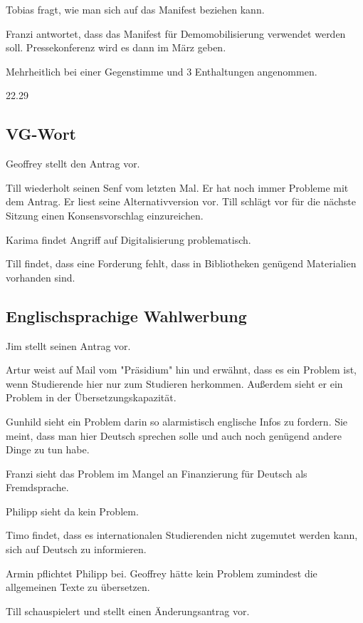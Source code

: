 \documentclass[ngerman,headheight=70pt]{scrartcl}
\begin{document}
    Tobias fragt, wie man sich auf das Manifest beziehen kann.

    Franzi antwortet, dass das Manifest für Demomobilisierung verwendet werden soll.
    Pressekonferenz wird es dann im März geben.

    Mehrheitlich bei einer Gegenstimme und 3 Enthaltungen angenommen.

    22.29
    \subsection{VG-Wort}

    Geoffrey stellt den Antrag vor.

    Till wiederholt seinen Senf vom letzten Mal. Er hat noch immer Probleme
    mit dem Antrag. Er liest seine Alternativversion vor. Till schlägt vor
    für die nächste Sitzung einen Konsensvorschlag einzureichen.

    Karima findet Angriff auf Digitalisierung problematisch.

    Till findet, dass eine Forderung fehlt, dass in Bibliotheken genügend
    Materialien vorhanden sind.

    \subsection{Englischsprachige Wahlwerbung}

    Jim stellt seinen Antrag vor.

    Artur weist auf Mail vom "Präsidium" hin und erwähnt, dass es ein Problem
    ist, wenn Studierende hier nur zum Studieren herkommen. Außerdem sieht
    er ein Problem in der Übersetzungskapazität.

    Gunhild sieht ein Problem darin so alarmistisch englische Infos zu fordern.
    Sie meint, dass man hier Deutsch sprechen solle und auch noch genügend andere
    Dinge zu tun habe.

    Franzi sieht das Problem im Mangel an Finanzierung für Deutsch als Fremdsprache.

    Philipp sieht da kein Problem.

    Timo findet, dass es internationalen Studierenden nicht zugemutet werden kann,
    sich auf Deutsch zu informieren.

    Armin pflichtet Philipp bei. Geoffrey hätte kein Problem zumindest die
    allgemeinen Texte zu übersetzen.

    Till schauspielert und stellt einen Änderungsantrag vor.
\end{document}
